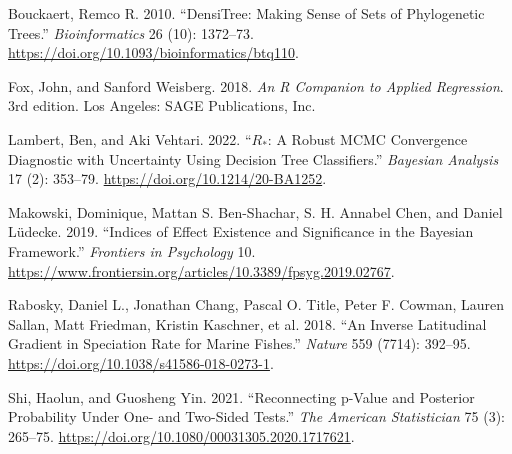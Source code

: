 \documentclass[
]{article}
\newlength{\cslhangindent}
\newlength{\cslentryspacingunit} %
\newenvironment{CSLReferences}[2] %
 {%
  \setlength{\parindent}{0pt}
  \ifodd #1
  \let\oldpar\par
  \def\par{\hangindent=\cslhangindent\oldpar}
  \fi
  \setlength{\parskip}{#2\cslentryspacingunit}
 }%
 {}
\begin{document}
\hypertarget{refs}{}
\begin{CSLReferences}{1}{0}
\leavevmode{}%
Bouckaert, Remco R. 2010. {``{DensiTree}: Making Sense of Sets of
Phylogenetic Trees.''} \emph{Bioinformatics} 26 (10): 1372--73.
\url{https://doi.org/10.1093/bioinformatics/btq110}.

\leavevmode{}%
Fox, John, and Sanford Weisberg. 2018. \emph{An {R} {Companion} to
{Applied} {Regression}}. 3rd edition. Los Angeles: SAGE Publications,
Inc.

\leavevmode{}%
Lambert, Ben, and Aki Vehtari. 2022. {``{\(R_\ast\)}: A Robust {MCMC}
Convergence Diagnostic with Uncertainty Using Decision Tree
Classifiers.''} \emph{Bayesian Analysis} 17 (2): 353--79.
\url{https://doi.org/10.1214/20-BA1252}.

\leavevmode{}%
Makowski, Dominique, Mattan S. Ben-Shachar, S. H. Annabel Chen, and
Daniel Lüdecke. 2019. {``Indices of {Effect} {Existence} and
{Significance} in the {Bayesian} {Framework}.''} \emph{Frontiers in
Psychology} 10.
\url{https://www.frontiersin.org/articles/10.3389/fpsyg.2019.02767}.

\leavevmode{}%
Rabosky, Daniel L., Jonathan Chang, Pascal O. Title, Peter F. Cowman,
Lauren Sallan, Matt Friedman, Kristin Kaschner, et al. 2018. {``An
Inverse Latitudinal Gradient in Speciation Rate for Marine Fishes.''}
\emph{Nature} 559 (7714): 392--95.
\url{https://doi.org/10.1038/s41586-018-0273-1}.

\leavevmode{}%
Shi, Haolun, and Guosheng Yin. 2021. {``Reconnecting p-{Value} and
{Posterior} {Probability} {Under} {One}- and {Two}-{Sided} {Tests}.''}
\emph{The American Statistician} 75 (3): 265--75.
\url{https://doi.org/10.1080/00031305.2020.1717621}.

\end{CSLReferences}
\end{document}
